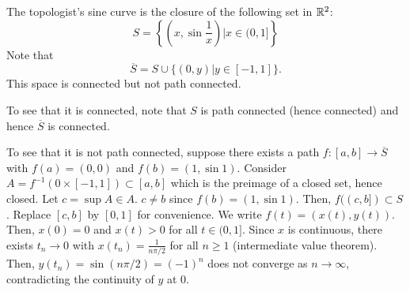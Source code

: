 \begin{example}
    The topologist's sine curve is the closure of the following set in $\mathbb{R}^2$:
    \[
        S=\left\{\left(x,\sin\frac{1}{x}\right)|x\in (0,1]\right\}
    \]
    Note that
    \[
        \overline{S}=S\cup \{(0,y)|y\in [-1,1]\}.
    \]
    This space is connected but not path connected.

    To see that it is connected, note that $S$ is path connected (hence connected) and hence $\overline{S}$ is connected.

    To see that it is not path connected, suppose there exists a path $f:[a,b]\to \overline{S}$ with $f(a)=(0,0)$ and $f(b)=(1,\sin 1)$. Consider $A=f^{-1}(0\times [-1,1])\subset [a,b]$ which is the preimage of a closed set, hence closed. Let $c=\sup A\in A$. $c\neq b$ since $f(b)=(1,\sin 1)$. Then, $f((c,b])\subset S$. Replace $[c,b]$ by $[0,1]$ for convenience. We write $f(t)=(x(t),y(t))$. Then, $x(0)=0$ and $x(t)>0$ for all $t\in (0,1]$. Since $x$ is continuous, there exists $t_n\to 0$ with $x(t_n)=\frac{1}{n\pi/2}$ for all $n\geq 1$ (intermediate value theorem). Then, $y(t_n)=\sin(n\pi/2)=(-1)^n$ does not converge as $n\to\infty$, contradicting the continuity of $y$ at $0$.
\end{example}







